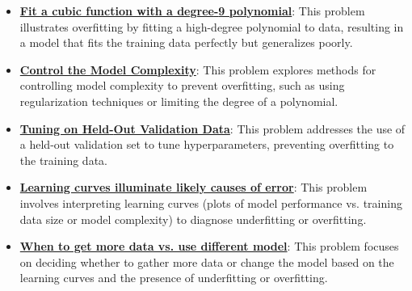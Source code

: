\documentclass{article}%
\begin{document}
\begin{itemize}[leftmargin=*]
\item \href{https://purdue.brightspace.com/d2l/common/assets/pdfjs-d2l-dist/1.0.14-legacy/web/viewer.html?file=\%2Fcontent\%2Fenforced\%2F1095467-wl.202510.CS.24300.001\%2F10L1-CrossValidation.pdf\%3Fou\%3D1095467\&lang=en-us\&container=d2l-fileviewer-rendered-pdf\&fullscreen=d2l-fileviewer-rendered-pdf-dialog\&height=667#page=15}{\textbf{Fit a cubic function with a degree{-}9 polynomial}}: This problem illustrates overfitting by fitting a high-degree polynomial to data, resulting in a model that fits the training data perfectly but generalizes poorly.%
\item \href{https://purdue.brightspace.com/d2l/common/assets/pdfjs-d2l-dist/1.0.14-legacy/web/viewer.html?file=\%2Fcontent\%2Fenforced\%2F1095467-wl.202510.CS.24300.001\%2F10L1-CrossValidation.pdf\%3Fou\%3D1095467\&lang=en-us\&container=d2l-fileviewer-rendered-pdf\&fullscreen=d2l-fileviewer-rendered-pdf-dialog\&height=667#page=16}{\textbf{Control the Model Complexity}}: This problem explores methods for controlling model complexity to prevent overfitting, such as using regularization techniques or limiting the degree of a polynomial.%
\item \href{https://purdue.brightspace.com/d2l/common/assets/pdfjs-d2l-dist/1.0.14-legacy/web/viewer.html?file=\%2Fcontent\%2Fenforced\%2F1095467-wl.202510.CS.24300.001\%2F10L1-CrossValidation.pdf\%3Fou\%3D1095467\&lang=en-us\&container=d2l-fileviewer-rendered-pdf\&fullscreen=d2l-fileviewer-rendered-pdf-dialog\&height=667#page=19}{\textbf{Tuning on Held{-}Out Validation Data}}: This problem addresses the use of a held-out validation set to tune hyperparameters, preventing overfitting to the training data.%
\item \href{https://purdue.brightspace.com/d2l/common/assets/pdfjs-d2l-dist/1.0.14-legacy/web/viewer.html?file=\%2Fcontent\%2Fenforced\%2F1095467-wl.202510.CS.24300.001\%2F10L1-CrossValidation.pdf\%3Fou\%3D1095467\&lang=en-us\&container=d2l-fileviewer-rendered-pdf\&fullscreen=d2l-fileviewer-rendered-pdf-dialog\&height=667#page=20}{\textbf{Learning curves illuminate likely causes of error}}: This problem involves interpreting learning curves (plots of model performance vs. training data size or model complexity) to diagnose underfitting or overfitting.%
\item \href{https://purdue.brightspace.com/d2l/common/assets/pdfjs-d2l-dist/1.0.14-legacy/web/viewer.html?file=\%2Fcontent\%2Fenforced\%2F1095467-wl.202510.CS.24300.001\%2F10L1-CrossValidation.pdf\%3Fou\%3D1095467\&lang=en-us\&container=d2l-fileviewer-rendered-pdf\&fullscreen=d2l-fileviewer-rendered-pdf-dialog\&height=667#page=21}{\textbf{When to get more data vs. use different model}}: This problem focuses on deciding whether to gather more data or change the model based on the learning curves and the presence of underfitting or overfitting.%

\end{itemize}
\end{document}
